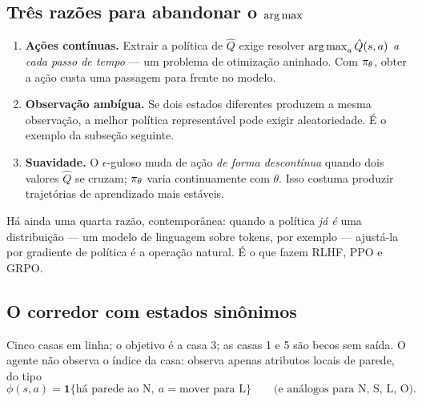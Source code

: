 \documentclass[11pt]{article}
\newcommand{\thv}{\theta}
\newcommand{\polth}{\pol_{\thv}}
\newcommand{\Qhat}{\hat{Q}}
\newcommand{\feat}{\phi}
\begin{document}
\subsection{Três razões para abandonar o \texorpdfstring{$\operatorname*{arg\,max}$}{argmax}}

\begin{enumerate}
  \item \textbf{Ações contínuas.} Extrair a política de $\Qhat$ exige resolver
    $\argmax_{a}\Qhat(s,a)$ \emph{a cada passo de tempo} --- um problema de
    otimização aninhado. Com $\polth$, obter a ação custa uma passagem para
    frente no modelo.
  \item \textbf{Observação ambígua.} Se dois estados diferentes produzem a mesma
    observação, a melhor política representável pode exigir aleatoriedade. É o
    exemplo da subseção seguinte.
  \item \textbf{Suavidade.} O $\epsilon$-guloso muda de ação \emph{de forma
    descontínua} quando dois valores $\Qhat$ se cruzam; $\polth$ varia
    continuamente com $\thv$. Isso costuma produzir trajetórias de aprendizado
    mais estáveis.
\end{enumerate}

Há ainda uma quarta razão, contemporânea: quando a política \emph{já é} uma
distribuição --- um modelo de linguagem sobre tokens, por exemplo --- ajustá-la
por gradiente de política é a operação natural. É o que fazem RLHF, PPO e GRPO.

\subsection{O corredor com estados sinônimos}

Cinco casas em linha; o objetivo é a casa 3; as casas 1 e 5 são becos sem saída.
O agente não observa o índice da casa: observa apenas atributos locais de
parede, do tipo
\[
  \feat(s,a) = \mathbf{1}\{\text{há parede ao N},\ a = \text{mover para L}\}
  \qquad\text{(e análogos para N, S, L, O).}
\]

\begin{center}
\end{center}
\end{document}
